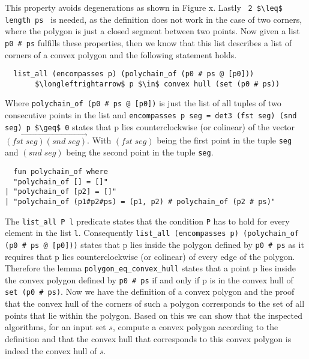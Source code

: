 This property avoids degenerations as shown in Figure x.
Lastly \lstinline| 2 $\leq$ length ps | is needed, as the definition does not work in the case 
of two corners, where the polygon is just a closed segment between two points.
Now given a list \lstinline|p0 # ps| fulfills these properties, then we know that this list
describes a list of corners of a convex polygon and the following statement holds.
\begin{lstlisting}
  list_all (encompasses p) (polychain_of (p0 # ps @ [p0]))
       $\longleftrightarrow$ p $\in$ convex hull (set (p0 # ps))
\end{lstlisting}  
Where \lstinline|polychain_of (p0 # ps @ [p0])| is just the list of all tuples of two 
consecutive points in the list and 
\lstinline|encompasses p seg = det3 (fst seg) (snd seg) p $\geq$ 0| states that p lies
counterclockwise (or colinear)  of the vector  $\overrightarrow{(fst \; seg) (snd \; seg)}$. 
With $(fst \; seg)$ being the first point in the tuple  
\lstinline|seg| and $(snd \; seg)$ being the second point in the tuple \lstinline|seg|.
\begin{lstlisting}
  fun polychain_of where
  "polychain_of [] = []"
| "polychain_of [p2] = []"
| "polychain_of (p1#p2#ps) = (p1, p2) # polychain_of (p2 # ps)"
\end{lstlisting}  
The \lstinline|list_all P l| predicate states that the condition \lstinline|P| has to hold
for every element in the list \lstinline|l|.
Consequently \lstinline|list_all (encompasses p) (polychain_of (p0 # ps @ [p0]))| states that p lies
inside the polygon defined by \lstinline|p0 # ps| as it requires that p lies counterclockwise (or colinear) 
of every edge of the polygon. Therefore the lemma \lstinline|polygon_eq_convex_hull| states that a point p
lies inside the convex polygon defined by \lstinline|p0 # ps| if and only if p is in the convex hull
of \lstinline|set (p0 # ps)|. Now we have the definition of a convex polygon and the proof that
the convex hull of the corners of such a 
polygon corresponds to the set of all points that lie within the polygon. Based on this we can show 
that the inspected algorithms, for an input set $s$, compute a convex polygon according to the definition  
and that the convex hull that corresponds to this convex polygon is indeed the convex hull of $s$.





